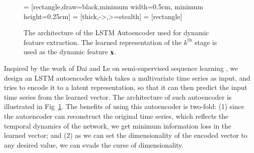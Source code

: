 \begin{figure}
	\centering
	\footnotesize
	 = [rectangle,draw=black,minimum width=0.5cm, minimum height=0.25cm]
	 = [thick,->,>=stealth]
	 = [rectangle]
	\caption{The architecture of the LSTM Autoencoder used for dynamic feature extraction. The learned representation of the $k^{\text{th}}$ stage is used as the dynamic feature $\mathbf{x}$.}
	\label{fig:autoencoder}
\end{figure}

Inspired by the work of Dai and Le on semi-supervised sequence learning \cite{dai2015semi}, we design an LSTM autoencoder which takes a multivariate time series as input, and tries to encode it to a latent representation, so that it can then predict the input time series from the learned vector. The architecture of such autoencoder is illustrated in Fig~\ref{fig:autoencoder}. The benefits of using this autoencoder is two-fold: (1) since the autoencoder can reconstruct the original time series, which reflects the temporal dynamics of the network, we get minimum information loss in the learned vector; and (2) as we can set the dimensionality of the encoded vector to any desired value, we can evade the curse of dimensionality. 


